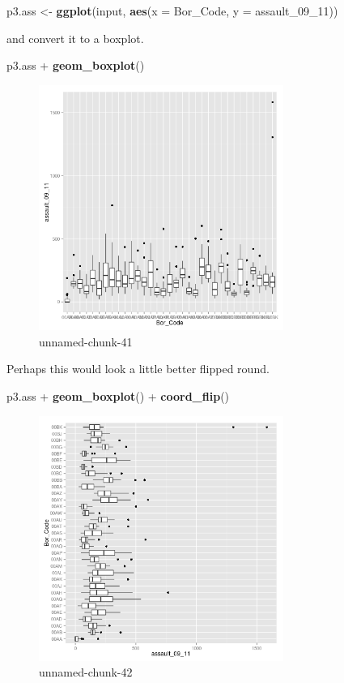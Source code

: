 \documentclass[]{article}
\newenvironment{Shaded}{}{}
\newcommand{\KeywordTok}[1]{\textcolor[rgb]{0.00,0.44,0.13}{\textbf{{#1}}}}
\newcommand{\DataTypeTok}[1]{\textcolor[rgb]{0.56,0.13,0.00}{{#1}}}
\newcommand{\NormalTok}[1]{{#1}}
\begin{document}
\begin{Shaded}
\begin{Highlighting}[]
\NormalTok{p3.ass <- }\KeywordTok{ggplot}\NormalTok{(input, }\KeywordTok{aes}\NormalTok{(}\DataTypeTok{x =} \NormalTok{Bor_Code, }\DataTypeTok{y =} \NormalTok{assault_09_11))}
\end{Highlighting}
\end{Shaded}
and convert it to a boxplot.

\begin{Shaded}
\begin{Highlighting}[]
\NormalTok{p3.ass + }\KeywordTok{geom_boxplot}\NormalTok{()}
\end{Highlighting}
\end{Shaded}
\begin{figure}[htbp]
\centering
\includegraphics[width=8cm]{figure/unnamed-chunk-41.png}
\caption{unnamed-chunk-41}
\end{figure}

Perhaps this would look a little better flipped round.

\begin{Shaded}
\begin{Highlighting}[]
\NormalTok{p3.ass + }\KeywordTok{geom_boxplot}\NormalTok{() + }\KeywordTok{coord_flip}\NormalTok{()}
\end{Highlighting}
\end{Shaded}
\begin{figure}[htbp]
\centering
\includegraphics[width=8cm]{figure/unnamed-chunk-42.png}
\caption{unnamed-chunk-42}
\end{figure}
\end{document}
